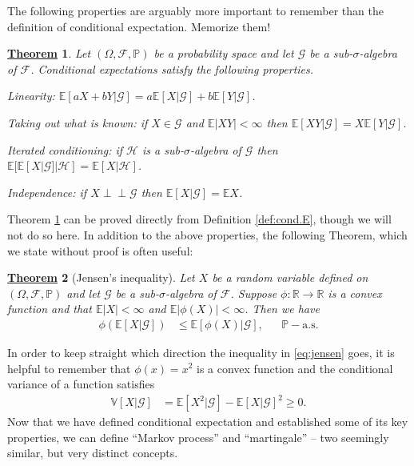 \documentclass[12pt]{book}
\let\varphi\phi
\numberwithin{equation}{chapter}
\theoremstyle{plain}
\newtheorem{theorem}{\underline{Theorem}}
\numberwithin{theorem}{section}
\theoremstyle{definition}
\numberwithin{exercise}{chapter}
\newcommand{\<}{\langle}
\renewcommand{\>}{\rangle}
\renewcommand{\(}{\left(}
\renewcommand{\)}{\right)}
\renewcommand{\[}{\left[}
\renewcommand{\]}{\right]}
\newcommand\Eb{\mathds{E}}
\newcommand\Pb{\mathds{P}}
\newcommand\Rb{\mathds{R}}
\newcommand\Vb{\mathds{V}}
\newcommand\Fc{\mathscr{F}}
\newcommand\Gc{\mathscr{G}}
\newcommand\Hc{\mathscr{H}}
\newcommand\Om{\Omega}
\newcommand\sig{\sigma}
\newcommand{\ind}{\perp \! \! \! \perp}
\begin{document}
\noindent
The following properties are arguably more important to remember than the definition of conditional expectation.  Memorize them!

\begin{theorem}
\label{thm:cond.E}
Let $(\Om, \Fc, \Pb)$ be a probability space and let $\Gc$ be a sub-$\sig$-algebra of $\Fc$.  Conditional expectations satisfy the following properties.
\begin{enumerate*}
\item Linearity: $\Eb[ a X + b Y | \Gc ] = a \Eb[ X | \Gc] + b \Eb[ Y | \Gc ]$.
\item Taking out what is known: if $X \in \Gc$ and $\Eb |XY| < \infty$ then $\Eb[ X Y | \Gc ] = X \Eb[ Y | \Gc ]$.
\item Iterated conditioning: if $\Hc$ is a sub-$\sig$-algebra of $\Gc$ then $\Eb[\Eb[X|\Gc]|\Hc]=\Eb[X|\Hc]$.
\item Independence: if $X \ind \Gc$ then $\Eb[X|\Gc]=\Eb X$.
\end{enumerate*}
\end{theorem}

\noindent
Theorem \ref{thm:cond.E} can be proved directly from Definition \ref{def:cond.E}, though we will not do so here.  In addition to the above properties, the following Theorem, which we state without proof is often useful:

\begin{theorem}[Jensen's inequality]
\label{thm:jensen}
Let $X$ be a random variable defined on $(\Om,\Fc,\Pb)$ and let $\Gc$ be a sub-$\sig$-algebra of $\Fc$.  Suppose $\varphi : \Rb \to \Rb$ is a convex function and that $\Eb |X| < \infty$ and $\Eb |\varphi(X)| < \infty$.  Then we have
\begin{align}
\varphi ( \Eb[ X | \Gc ] )
	&\leq \Eb[ \varphi(X) | \Gc ] , &
	&\Pb-\text{a.s.} \label{eq:jensen}
\end{align}
\end{theorem}

\noindent
In order to keep straight which direction the inequality in \eqref{eq:jensen} goes, it is helpful to remember that $\phi(x) = x^2$ is a convex function and the conditional variance of a function satisfies
\begin{align}
\Vb[ X | \Gc]
	&=	\Eb[ X^2 | \Gc ] - \Eb[ X | \Gc ]^2
	\geq 0 .
\end{align}
Now that we have defined conditional expectation and established some of its key properties, we can define ``Markov process'' and ``martingale'' -- two seemingly similar, but very distinct concepts.
\end{document}
